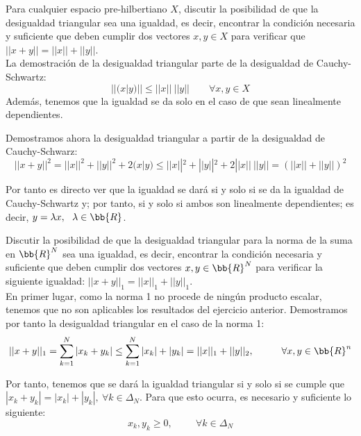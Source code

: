 \begin{ejercicio}
    Para cualquier espacio pre-hilbertiano $X$, discutir la posibilidad de que la desigualdad triangular sea una igualdad, es decir, encontrar la condición necesaria y suﬁciente que deben cumplir dos vectores $x, y \in X$ para veriﬁcar que $|| x + y|| =|| x|| + ||y||$.\\

    La demostración de la desigualdad triangular parte de la desigualdad de Cauchy-Schwartz: $$||(x|y)|| \leq ||x||~||y|| \qquad \forall x,y\in X$$
    Además, tenemos que la igualdad se da solo en el caso de que sean linealmente dependientes.

    Demostramos ahora la desigualdad triangular a partir de la desigualdad de Cauchy-Schwarz:
    \begin{equation*}
        ||x+y||^2 = ||x||^2 + ||y||^2 + 2(x|y) \leq ||x||^2 + ||y||^2 + 2||x||~||y|| = \left(||x|| + ||y||\right)^2
    \end{equation*}

    Por tanto es directo ver que la igualdad se dará si y solo si se da la igualdad de Cauchy-Schwartz y; por tanto, si y solo si ambos son linealmente dependientes; es decir, $y=\lambda x, ~~\lambda \in \bb{R}$.
\end{ejercicio}

\begin{ejercicio}
    Discutir la posibilidad de que la desigualdad triangular para la norma de la suma en $\bb{R}^N$ sea una igualdad, es decir, encontrar la condición necesaria y suﬁciente que deben cumplir dos vectores $x, y \in \bb{R}^N$ para veriﬁcar la siguiente igualdad: $ ||x + y||_1 =|| x||_1 +|| y||_1$.\\

    En primer lugar, como la norma 1 no procede de ningún producto escalar, tenemos que no son aplicables los resultados del ejercicio anterior. Demostramos por tanto la desigualdad triangular en el caso de la norma 1:
    \begin{equation*}
        ||x+y||_1 = \sum_{k=1}^N |x_k + y_k| \leq \sum_{k=1}^N |x_k| + |y_k| = ||x||_1 + ||y||_2, \hspace{1cm} \forall x,y\in \bb{R}^n
    \end{equation*}

    Por tanto, tenemos que se dará la igualdad triangular si y solo si se cumple que $|x_k + y_k| = |x_k| + |y_k|,~\forall k\in \Delta_N$. Para que esto ocurra, es necesario y suficiente lo siguiente: $$x_k, y_k\geq 0,\hspace{1cm} \forall k\in \Delta_N$$
\end{ejercicio}

